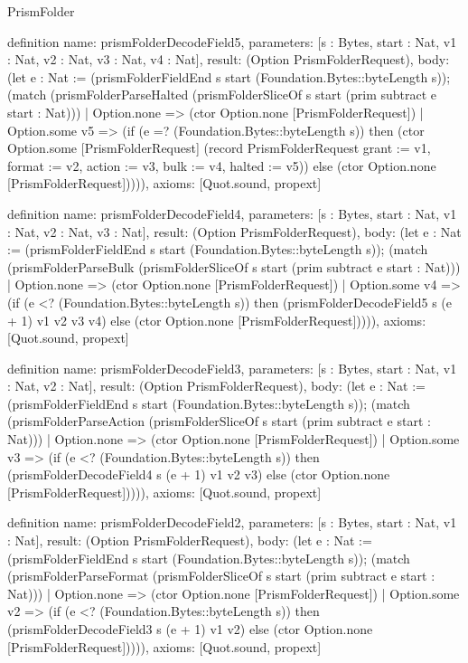 \begin{lexlean}{PrismFolder}
\begin{semanticmodule}
definition{
  name: prismFolderDecodeField5,
  parameters: [s : Bytes, start : Nat, v1 : Nat, v2 : Nat, v3 : Nat, v4 : Nat],
  result: (Option PrismFolderRequest),
  body: (let e : Nat := (prismFolderFieldEnd s start (Foundation.Bytes::byteLength s)); (match (prismFolderParseHalted (prismFolderSliceOf s start (prim subtract e start : Nat)))
    | Option.none => (ctor Option.none [PrismFolderRequest])
    | Option.some v5 => (if (e =? (Foundation.Bytes::byteLength s)) then (ctor Option.some [PrismFolderRequest] (record PrismFolderRequest {grant := v1, format := v2, action := v3, bulk := v4, halted := v5})) else (ctor Option.none [PrismFolderRequest])))),
  axioms: [Quot.sound, propext]
}

definition{
  name: prismFolderDecodeField4,
  parameters: [s : Bytes, start : Nat, v1 : Nat, v2 : Nat, v3 : Nat],
  result: (Option PrismFolderRequest),
  body: (let e : Nat := (prismFolderFieldEnd s start (Foundation.Bytes::byteLength s)); (match (prismFolderParseBulk (prismFolderSliceOf s start (prim subtract e start : Nat)))
    | Option.none => (ctor Option.none [PrismFolderRequest])
    | Option.some v4 => (if (e <? (Foundation.Bytes::byteLength s)) then (prismFolderDecodeField5 s (e + 1) v1 v2 v3 v4) else (ctor Option.none [PrismFolderRequest])))),
  axioms: [Quot.sound, propext]
}

definition{
  name: prismFolderDecodeField3,
  parameters: [s : Bytes, start : Nat, v1 : Nat, v2 : Nat],
  result: (Option PrismFolderRequest),
  body: (let e : Nat := (prismFolderFieldEnd s start (Foundation.Bytes::byteLength s)); (match (prismFolderParseAction (prismFolderSliceOf s start (prim subtract e start : Nat)))
    | Option.none => (ctor Option.none [PrismFolderRequest])
    | Option.some v3 => (if (e <? (Foundation.Bytes::byteLength s)) then (prismFolderDecodeField4 s (e + 1) v1 v2 v3) else (ctor Option.none [PrismFolderRequest])))),
  axioms: [Quot.sound, propext]
}

definition{
  name: prismFolderDecodeField2,
  parameters: [s : Bytes, start : Nat, v1 : Nat],
  result: (Option PrismFolderRequest),
  body: (let e : Nat := (prismFolderFieldEnd s start (Foundation.Bytes::byteLength s)); (match (prismFolderParseFormat (prismFolderSliceOf s start (prim subtract e start : Nat)))
    | Option.none => (ctor Option.none [PrismFolderRequest])
    | Option.some v2 => (if (e <? (Foundation.Bytes::byteLength s)) then (prismFolderDecodeField3 s (e + 1) v1 v2) else (ctor Option.none [PrismFolderRequest])))),
  axioms: [Quot.sound, propext]
}


\end{semanticmodule}
\end{lexlean}
